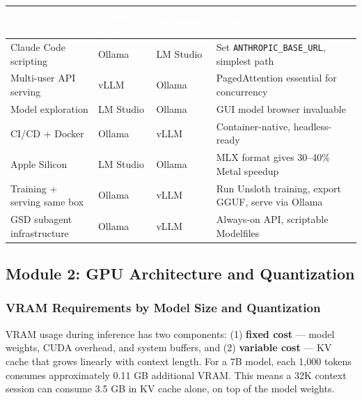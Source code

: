 \documentclass[11pt,letterpaper]{article}
\newcommand{\tableheader}[1]{\textbf{\sffamily\textcolor{white}{#1}}}
\begin{document}
\begin{center}
\begin{tabularx}{\textwidth}{L{3.5cm}L{3cm}L{3cm}X}
\toprule
{}
\tableheader{Use Case} & \tableheader{Primary Tool} & \tableheader{Secondary} & \tableheader{Notes} \\
\midrule
Claude Code scripting & Ollama & LM Studio & Set \texttt{ANTHROPIC\_BASE\_URL}, simplest path \\
Multi-user API serving & vLLM & Ollama & PagedAttention essential for concurrency \\
Model exploration & LM Studio & Ollama & GUI model browser invaluable \\
CI/CD + Docker & Ollama & vLLM & Container-native, headless-ready \\
Apple Silicon & LM Studio & Ollama & MLX format gives 30--40\% Metal speedup \\
Training + serving same box & Ollama & vLLM & Run Unsloth training, export GGUF, serve via Ollama \\
GSD subagent infrastructure & Ollama & vLLM & Always-on API, scriptable Modelfiles \\
\bottomrule
\end{tabularx}
\end{center}

\subsection{Module 2: GPU Architecture and Quantization}

\subsubsection{VRAM Requirements by Model Size and Quantization}

VRAM usage during inference has two components: (1) \textbf{fixed cost} --- model weights, CUDA overhead, and system buffers, and (2) \textbf{variable cost} --- KV cache that grows linearly with context length. For a 7B model, each 1,000 tokens consumes approximately 0.11 GB additional VRAM. This means a 32K context session can consume 3.5 GB in KV cache alone, on top of the model weights.
\end{document}
